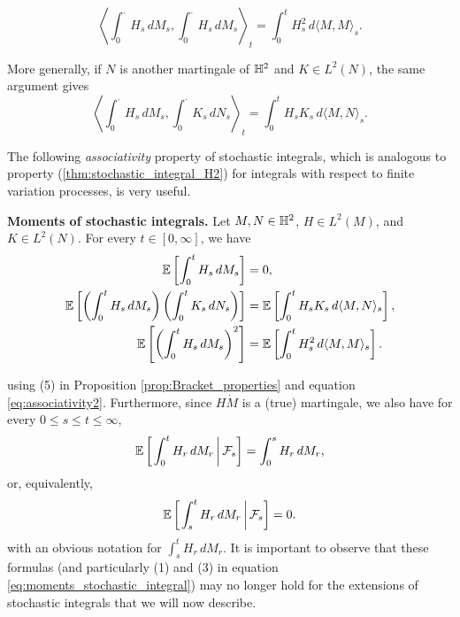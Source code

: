 \documentclass[../Main.tex]{subfiles}
\begin{document}
$$\left\langle \int_0^\cdot H_s \, dM_s, \int_0^\cdot H_s \, dM_s \right\rangle_t = \int_0^t H_s^2 \, d\langle M, M \rangle_s. $$

More generally, if $N$ is another martingale of $\mathbb{H}^2$ and $K \in L^2(N)$, the same argument gives
\begin{equation} \label{eq:associativity2}
    \left\langle \int_0^\cdot H_s \, dM_s, \int_0^\cdot K_s \, dN_s \right\rangle_t = \int_0^t H_s K_s \, d\langle M, N \rangle_s. 
\end{equation}

The following \textit{associativity} property of stochastic integrals, which is analogous to property (\ref{thm:stochastic_integral_H2}) for integrals with respect to finite variation processes, is very useful.


\textbf{Moments of stochastic integrals.} Let $M,N\in\mathbb{H}^2$,
$H\in L^2(M)$, and $K\in L^2(N)$. For every $t\in [0,\infty]$, we have
\begin{equation}\label{eq:moments_stochastic_integral}
\begin{aligned}
\mathbb{E}\left[\int_0^t H_s\,dM_s\right]
&=0,\\ 
\mathbb{E}\left[ \left(\int_0^t H_s\,dM_s\right) \left(\int_0^t K_s\,dN_s\right) \right]
&= \mathbb{E}\left[ \int_0^t H_sK_s\,d\langle M,N\rangle_s \right],\\
\mathbb{E}\left[ \left(\int_0^t H_s\,dM_s\right)^2 \right]
&= \mathbb{E}\left[ \int_0^t H_s^2\,d\langle M,M\rangle_s \right].
\end{aligned}
\end{equation}

using (5) in Proposition \ref{prop:Bracket_properties} and equation \ref{eq:associativity2}. 
Furthermore, since $H \dot M$ is a (true) martingale, we also have for every $0 \leq s \leq t \leq \infty$,
\begin{equation} \label{eq:martingal_integral}
\mathbb{E}\left[\left.\int_0^t H_r\,dM_r\,\right|\mathcal{F}_s\right] =\int_0^s H_r\,dM_r, 
\end{equation}
or, equivalently,
\[
\mathbb{E}\left[\left.\int_s^t H_r\,dM_r\,\right|\mathcal{F}_s\right]=0.
\]
with an obvious notation for $\int_s^t H_r \, dM_r$. It is important to observe that these formulas (and particularly (1) and (3) in equation \ref{eq:moments_stochastic_integral}) may no longer hold for the extensions of stochastic integrals that we will now describe.
\end{document}
